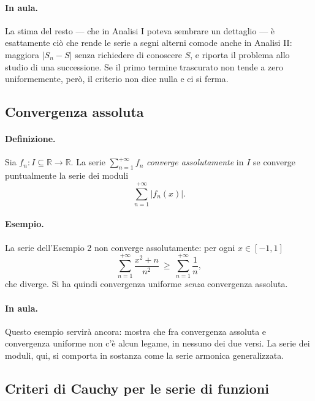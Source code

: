 \paragraph{In aula.} La stima del resto — che in Analisi I poteva sembrare un dettaglio —
è esattamente ciò che rende le serie a segni alterni comode anche in Analisi II: maggiora
$|S_n-S|$ senza richiedere di conoscere $S$, e riporta il problema allo studio di una
successione. Se il primo termine trascurato non tende a zero uniformemente, però, il
criterio non dice nulla e ci si ferma.

\subsection{Convergenza assoluta}

\paragraph{Definizione.} Sia $f_n:I\subseteq\mathbb{R}\to\mathbb{R}$. La serie
$\sum_{n=1}^{+\infty}f_n$ \emph{converge assolutamente} in $I$ se converge puntualmente la
serie dei moduli
\begin{equation}
\sum_{n=1}^{+\infty}|f_n(x)| .
\end{equation}

\paragraph{Esempio.} La serie dell'Esempio 2 non converge assolutamente: per ogni
$x\in[-1,1]$
\begin{equation}
\sum_{n=1}^{+\infty}\frac{x^2+n}{n^2}\ \ge\ \sum_{n=1}^{+\infty}\frac{1}{n},
\end{equation}
che diverge. Si ha quindi convergenza uniforme \emph{senza} convergenza assoluta.

\paragraph{In aula.} Questo esempio servirà ancora: mostra che fra convergenza assoluta e
convergenza uniforme non c'è alcun legame, in nessuno dei due versi. La serie dei moduli,
qui, si comporta in sostanza come la serie armonica generalizzata.

\subsection{Criteri di Cauchy per le serie di funzioni}

